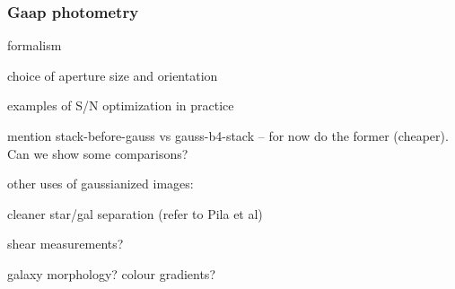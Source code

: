 \subsubsection{Gaap photometry}


formalism

choice of aperture size and orientation

examples of S/N optimization in practice



mention stack-before-gauss vs gauss-b4-stack -- for now do the former (cheaper). Can we show some comparisons?


other uses of gaussianized images:

cleaner star/gal separation (refer to Pila et al)

shear measurements?

galaxy morphology? colour gradients? 
